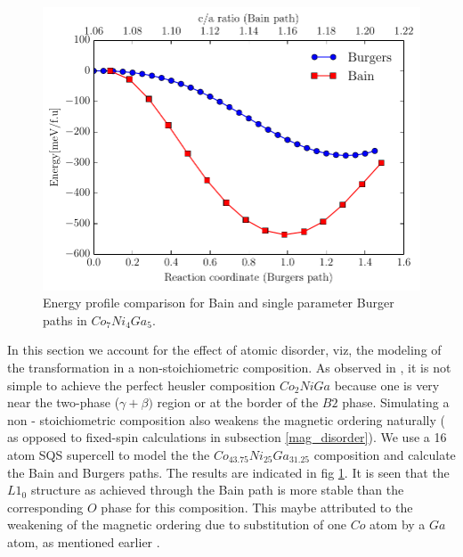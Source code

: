 \documentclass[%
preprint,
 amsmath,amssymb,
 aps,
prb,
showkeys,
]{revtex4-1}
\begin{document}
\begin{figure}[htp!]
  \includegraphics[scale=1.0]{figure_10}
  \caption{Energy profile comparison for Bain and single parameter Burger  paths in   $Co_7Ni_4Ga_5$.}
  \label{fig:non_stoic}
\end{figure}
In this section we account for the effect of atomic disorder, viz, the modeling of the transformation in  a non-stoichiometric composition. As observed in \cite{siewert2010electronic}, it is not 
simple to  achieve the perfect heusler composition $Co_2NiGa$  because one is very near the two-phase ($\gamma+\beta)$ region or at the border  of the $B2$ 
phase. Simulating a non - stoichiometric composition also weakens the magnetic ordering naturally ( as opposed to fixed-spin calculations in subsection 
\ref{mag_disorder}). We use a 16 atom SQS supercell to model the the $Co_{43.75}Ni_{25}Ga_{31.25}$  composition and calculate the Bain and Burgers paths. The results are indicated in fig \ref{fig:non_stoic}. It is seen that the $L1_0$  structure as achieved through the Bain path is more stable than the corresponding $O$ phase for this composition. This maybe attributed to the weakening of the magnetic ordering due to substitution of one $Co$ atom by a  $Ga$ atom, as mentioned earlier .
\end{document}
